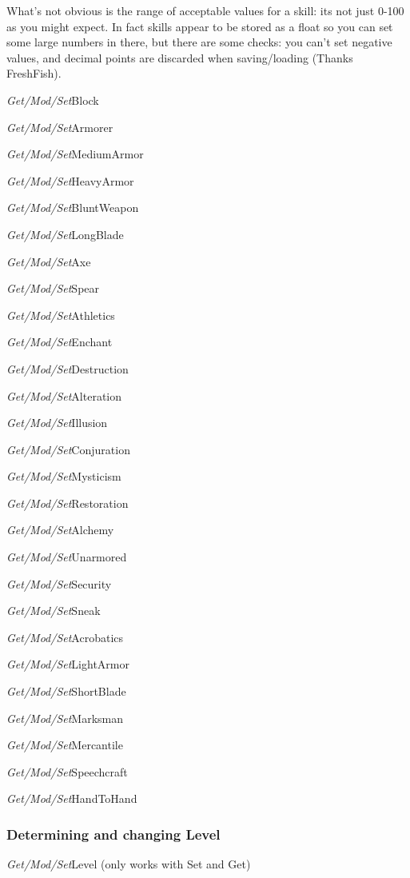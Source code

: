 \documentclass[
]{article}
\begin{document}
What's not obvious is the range of acceptable values for a skill: its
not just 0-100 as you might expect. In fact skills appear to be stored
as a float so you can set some large numbers in there, but there are
some checks: you can't set negative values, and decimal points are
discarded when saving/loading (Thanks FreshFish).

\emph{Get/Mod/Set}Block

\emph{Get/Mod/Set}Armorer

\emph{Get/Mod/Set}MediumArmor

\emph{Get/Mod/Set}HeavyArmor

\emph{Get/Mod/Set}BluntWeapon

\emph{Get/Mod/Set}LongBlade

\emph{Get/Mod/Set}Axe

\emph{Get/Mod/Set}Spear

\emph{Get/Mod/Set}Athletics

\emph{Get/Mod/Set}Enchant

\emph{Get/Mod/Set}Destruction

\emph{Get/Mod/Set}Alteration

\emph{Get/Mod/Set}Illusion

\emph{Get/Mod/Set}Conjuration

\emph{Get/Mod/Set}Mysticism

\emph{Get/Mod/Set}Restoration

\emph{Get/Mod/Set}Alchemy

\emph{Get/Mod/Set}Unarmored

\emph{Get/Mod/Set}Security

\emph{Get/Mod/Set}Sneak

\emph{Get/Mod/Set}Acrobatics

\emph{Get/Mod/Set}LightArmor

\emph{Get/Mod/Set}ShortBlade

\emph{Get/Mod/Set}Marksman

\emph{Get/Mod/Set}Mercantile

\emph{Get/Mod/Set}Speechcraft

\emph{Get/Mod/Set}HandToHand

\hypertarget{determining-and-changing-level}{%
\subsubsection{Determining and changing
Level}\label{determining-and-changing-level}}

\emph{Get/Mod/Set}Level (only works with Set and Get)
\end{document}
